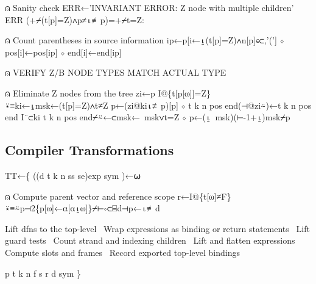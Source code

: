 \documentclass{article}%
\begin{document}
⍝ Sanity check
ERR←'INVARIANT ERROR: Z node with multiple children'
ERR (+⌿(t[p]=Z)∧p≠⍳≢p)=+⌿t=Z:

⍝ Count parentheses in source information
ip←p[i←⍸(t[p]=Z)∧n[p]∊⊂,'('] ⋄ pos[i]←pos[ip] ⋄ end[i]←end[ip]

⍝ VERIFY Z/B NODE TYPES MATCH ACTUAL TYPE

⍝ Eliminate Z nodes from the tree
zi←p I@\{t[p[⍵]]=Z\}⍣≡ki←⍸msk←(t[p]=Z)∧t≠Z
p←(zi@ki⍳≢p)[p] ⋄ t k n pos end(⊣@zi⍨)←t k n pos end I¨⊂ki
t k n pos end⌿⍨←⊂msk←~msk∨t=Z ⋄ p←(⍸~msk)(⊢-1+⍸)msk⌿p
\nwendcode{}\nwdocspar

\subsection{Compiler Transformations}

\nwenddocs{}\endmoddef\nwstartdeflinemarkup{}\nwenddeflinemarkup
TT←\{
        ((d t k n ss se)exp sym )←⍵
        
        ⍝ Compute parent vector and reference scope
        r←I@\{t[⍵]≠F\}⍣≡⍨p⊣2\{p[⍵]←⍺[⍺⍸⍵]\}⌿⊢∘⊂⌸d⊣p←⍳≢d

        \LA{}Lift dfns to the top-level~{\nwtagstyle{}}\RA{}
        \LA{}Wrap expressions as binding or return statements~{\nwtagstyle{}}\RA{}
        \LA{}Lift guard tests~{\nwtagstyle{}}\RA{}
        \LA{}Count strand and indexing children~{\nwtagstyle{}}\RA{}
        \LA{}Lift and flatten expressions~{\nwtagstyle{}}\RA{}
        \LA{}Compute slots and frames~{\nwtagstyle{}}\RA{}
        \LA{}Record exported top-level bindings~{\nwtagstyle{}}\RA{}
        
        p t k n f s r d  sym
\}
\nwendcode{}\nwdocspar
        
\end{document}
